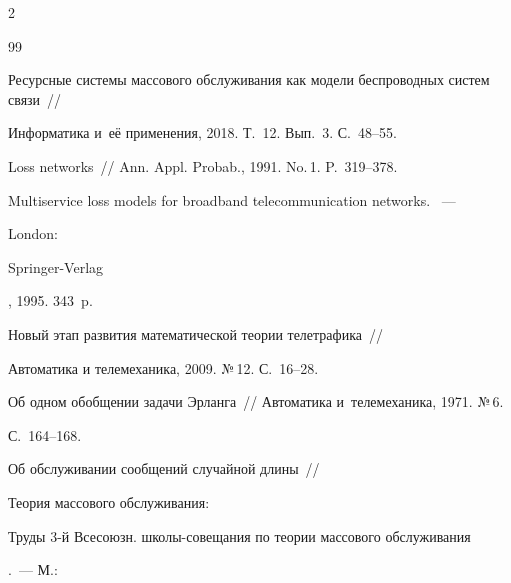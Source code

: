 \begin{multicols}{2}
{{\begin{thebibliography}{99}


Ресурсные сис\-те\-мы массового обслуживания как модели беспроводных сис\-тем связи~// 


{Информатика и~её применения}, 2018. Т.~12. Вып.~3. С.~48--55.











Loss networks~// {Ann. Appl. Probab.}, 1991. No.\,1. P.~319--378.











{Multiservice loss models for broadband telecommunication networks}. ~--- {London: 


Springer-Verlag}, 1995. 343~p.











Новый этап развития математической теории телетрафика~// 


Автоматика и телемеханика, 2009.  №\,12. С.~16--28.





 











Об одном обобщении задачи Эрланга~// {Автоматика и~телемеханика}, 1971. №\,6. 


С.~164--168.











Об обслуживании сообщений случайной длины~// {Теория массового обслуживания: 


Труды 3-й Всесоюзн. шко\-лы-со\-ве\-ща\-ния по тео\-рии массового обслуживания}.~--- М.: 



\end{thebibliography}}}
\end{multicols}
